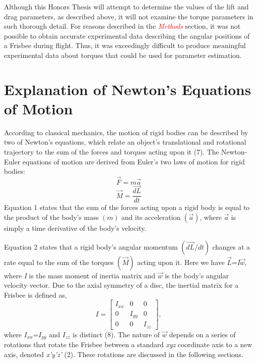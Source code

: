 \documentclass[a4paper,12pt, oneside]{article}
\newcommand{\red}[1]{\textcolor{red}{#1}}
\begin{document}
Although this Honors Thesis will attempt to determine the values of the lift and drag parameters, as described above, it will not examine the torque parameters in such thorough detail. For reasons described in the \red{\textit{Methods}} section, it was not possible to obtain accurate experimental data describing the angular positions of a Frisbee during flight. Thus, it was exceedingly difficult to produce meaningful experimental data about torques that could be used for parameter estimation.

\color{black}
\section{Explanation of Newton's Equations of Motion} 

According to classical mechanics, the motion of rigid bodies can be described by two of Newton's equations, which relate an object's translational and rotational trajectory to the sum of the forces and torques acting upon it (7).  The Newton-Euler equations of motion are derived from Euler's two laws of motion for rigid bodies:
\begin{equation}
\vec{F}=\textit{m}\vec{a}
\end{equation}
\begin{equation}
\vec{M}=\dfrac{\vec{dL}}{dt}
\end{equation}
Equation 1 states that the sum of the forces acting upon a rigid body is equal to the product of the body's mass $(\textit{m})$ and its acceleration $(\vec{a})$, where $\vec{a}$ is simply a time derivative of the body's velocity.  

Equation 2 states that a rigid body's angular momentum $(\vec{dL}/dt)$ changes at a rate equal to the sum of the torques $(\vec{M})$ acting upon it. Here we have $\vec{L}$=\textit{I}$\vec{w}$, where \textit{I} is the mass moment of inertia matrix and $\vec{w}$ is the body's angular velocity vector. Due to the axial symmetry of a disc, the inertial matrix for a Frisbee is defined as,  
\begin{equation*}
I=\begin{bmatrix}
I_{xx} & 0 & 0 \\
0 & I_{yy} & 0 \\ 
0 & 0 & I_{zz}
\end{bmatrix},
\end{equation*}
where $I_{xx}$=$I_{yy}$ and $I_{zz}$ is distinct (8).  The nature of $\vec{w}$ depends on a series of rotations that rotate the Frisbee between a standard \textit{xyz} coordinate axis to a new axis, denoted \textit{x'y'z'} (2). These rotations are discussed in the following sections.
\end{document}
